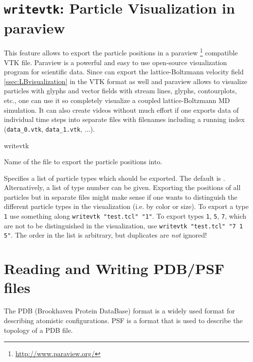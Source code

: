 \section{\texttt{writevtk}: Particle Visualization in paraview}
\label{sec:writevtk}

This feature allows to export the particle positions in a paraview
\footnote{\url{http://www.paraview.org/}} compatible VTK
file. Paraview is a powerful and easy to use open-source visualization
program for scientific data. Since \es can export the
lattice-Boltzmann velocity field \ref{ssec:LBvisualization} in the VTK
format as well and paraview allows to visualize particles with glyphs
and vector fields with stream lines, glyphs, contourplots, etc., one
can use it so completely visualize a coupled lattice-Boltzmann MD
simulation. It can also create videos without much effort if one
exports data of individual time steps into separate files with
filenames including a running index (\texttt{data_0.vtk},
\texttt{data_1.vtk}, ...).

\begin{essyntax}
  writevtk  
\end{essyntax}

\begin{arguments}
\item[\var{filename}]
  Name of the file to export the particle positions into.
\item[\opt{\alt{all \asep \var{type}}}] Specifies a list of particle
  types which should be exported. The default is
  . Alternatively, a list of type number can be
  given. Exporting the positions of all particles but in separate
  files might make sense if one wants to distinguish the different
  particle types in the visualization (i.e. by color or size).  To
  export a type \texttt{1} use something along \texttt{writevtk
    "test.tcl" "1"}.  To export types \texttt{1}, \texttt{5},
  \texttt{7}, which are not to be distinguished in the visualization,
  use \texttt{writevtk "test.tcl" "7 1 5"}.  The order in the list is
  arbitrary, but duplicates are \emph{not} ignored!
\end{arguments}

\section{Reading and Writing PDB/PSF files}
The PDB (Brookhaven Protein DataBase) format is a widely used format
for describing atomistic configurations. PSF is a format that is used
to describe the topology of a PDB file. 

